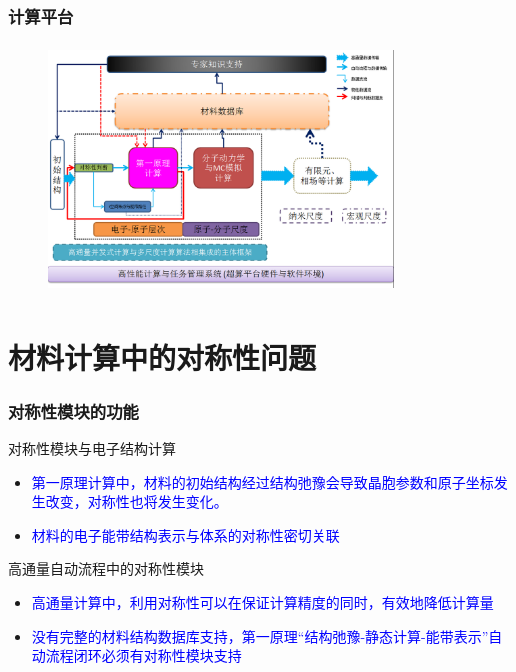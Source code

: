 \documentclass[cjk,slidestop,handout,compress,mathserif,blue]{beamer}	%
\begin{document}
\frame
{
	\frametitle{\textrm{计算平台}}
\begin{figure}[h!]
\centering
\vspace*{-0.2in}
\includegraphics[height=2.6in,width=3.6in,viewport=0 0 1038 730,clip]{Figures/Auto_Flow.png}
\caption{\fontsize{7.2pt}{4.2pt}}%
\label{Auto_Flow}
\end{figure} 
}

\section{材料计算中的对称性问题}
\frame
{
	\frametitle{对称性模块的功能}
	对称性模块与电子结构计算
	\begin{itemize}
		\item \textcolor{blue}{第一原理计算中，材料的初始结构经过结构弛豫会导致晶胞参数和原子坐标发生改变，对称性也将发生变化。}
		\item \textcolor{blue}{材料的电子能带结构表示与体系的对称性密切关联}
	\end{itemize}
	\vskip 30pt
	高通量自动流程中的对称性模块
	\begin{itemize}
		\item \textcolor{blue}{高通量计算中，利用对称性可以在保证计算精度的同时，有效地降低计算量}
		\item \textcolor{blue}{没有完整的材料结构数据库支持，第一原理“结构弛豫-静态计算-能带表示”自动流程闭环必须有对称性模块支持}
	\end{itemize}
}
\end{document}
